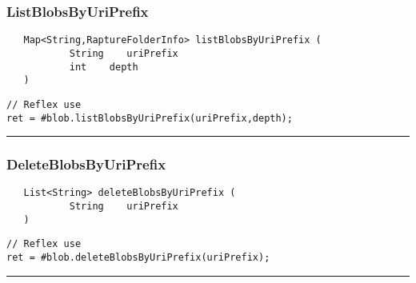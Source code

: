 \subsubsection{ListBlobsByUriPrefix}
\label{Api:ListBlobsByUriPrefix}
\begin{verbatim}
   Map<String,RaptureFolderInfo> listBlobsByUriPrefix (
           String    uriPrefix
           int    depth
   )
\end{verbatim}
\begin{lstlisting}[language=reflex]
// Reflex use
ret = #blob.listBlobsByUriPrefix(uriPrefix,depth);
\end{lstlisting}



\rule{15cm}{2pt}
\subsubsection{DeleteBlobsByUriPrefix}
\label{Api:DeleteBlobsByUriPrefix}
\begin{verbatim}
   List<String> deleteBlobsByUriPrefix (
           String    uriPrefix
   )
\end{verbatim}
\begin{lstlisting}[language=reflex]
// Reflex use
ret = #blob.deleteBlobsByUriPrefix(uriPrefix);
\end{lstlisting}



\rule{15cm}{2pt}
